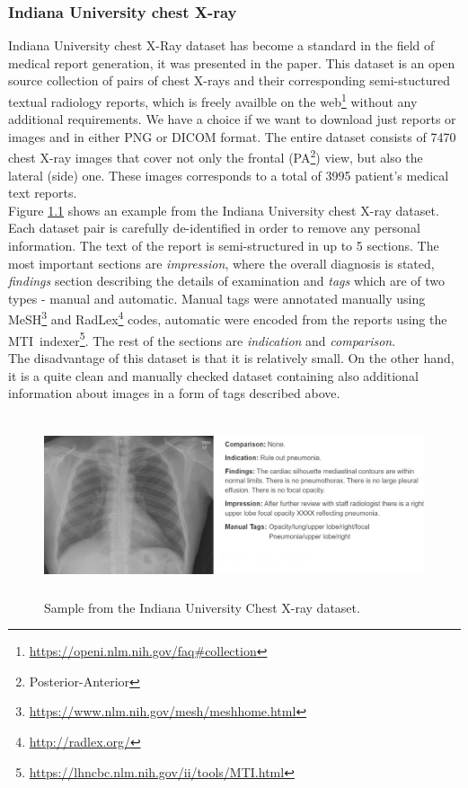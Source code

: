 \subsubsection{Indiana University chest X-ray}
\label{sec:IUDataset}
Indiana University chest X-Ray dataset has become a standard in the field of medical report generation, it was presented in the \citet{10.1093/jamia/ocv080} paper. This dataset is an open source collection of pairs of chest X-rays and their corresponding semi-stuctured textual radiology reports, which is freely availble on the web\footnote[4]{\url{https://openi.nlm.nih.gov/faq\#collection}} without any additional requirements. We have a choice if we want to download just reports or images and in either PNG or DICOM format. The entire dataset consists of 7470 chest X-ray images that cover not only the frontal (PA\footnote[5]{Posterior-Anterior}) view, but also the lateral (side) one. These images corresponds to a total of 3995 patient's medical text reports.\\

Figure \hyperref[fig01:IUChestXRaySample]{1.1} shows an example from the Indiana University chest X-ray dataset. Each dataset pair is carefully de-identified in order to remove any personal information. The text of the report is semi-structured in up to 5 sections. The most important sections are \textit{impression}, where the overall diagnosis is stated, \textit{findings} section describing the details of examination and \textit{tags} which are of two types - manual and automatic. Manual tags were annotated manually using MeSH\footnote[6]{\url{https://www.nlm.nih.gov/mesh/meshhome.html}} and RadLex\footnote[7]{\url{http://radlex.org/}} codes, automatic were encoded from the reports using the MTI~indexer\footnote[8]{\url{https://lhncbc.nlm.nih.gov/ii/tools/MTI.html}}. The rest of the sections are \textit{indication} and \textit{comparison}.\\

The disadvantage of this dataset is that it is relatively small. On the other hand, it is a quite clean and manually checked dataset containing also additional information about images in a form of tags described above.

\begin{figure}[h]\centering
\includegraphics[width=145mm, height=53mm]{../img/IUChestXRaySample_CXR1728_IM-0479-1001}
\caption{Sample from the Indiana University Chest X-ray dataset.}
\label{fig01:IUChestXRaySample}
\end{figure}

